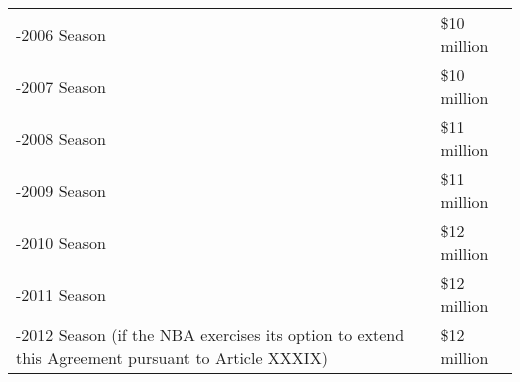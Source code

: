 \documentclass[
]{book}
\begin{document}
\begin{enumerate}
  \begin{longtable}[]{@{}
    >{\raggedright\arraybackslash}p{}
    >{\centering\arraybackslash}p{}@{}}
  \toprule()
  \endhead
  2005-2006 Season & \$10 million \\
  2006-2007 Season & \$10 million \\
  2007-2008 Season & \$11 million \\
  2008-2009 Season & \$11 million \\
  2009-2010 Season & \$12 million \\
  2010-2011 Season & \$12 million \\
  2011-2012 Season (if the NBA exercises its option to extend this Agreement pursuant to Article XXXIX) & \$12 million \\
  \bottomrule()
  \end{longtable}


\end{enumerate}
\end{document}
